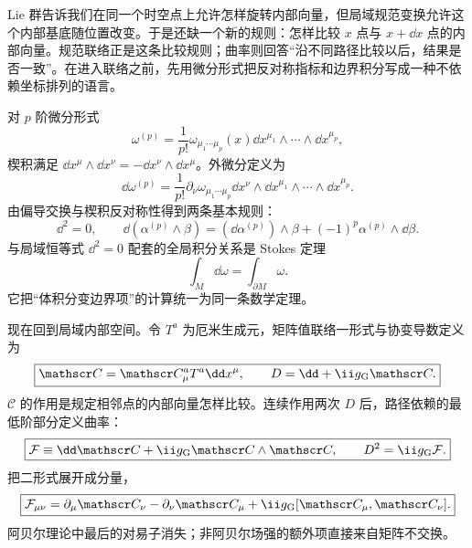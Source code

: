 Lie 群告诉我们在同一个时空点上允许怎样旋转内部向量，但局域规范变换允许这个内部基底随位置改变。于是还缺一个新的规则：怎样比较 $x$ 点与 $x+\dd x$ 点的内部向量。规范联络正是这条比较规则；曲率则回答“沿不同路径比较以后，结果是否一致”。在进入联络之前，先用微分形式把反对称指标和边界积分写成一种不依赖坐标排列的语言。

对 $p$ 阶微分形式
\begin{equation*}
 \omega^{(p)}
 =\frac1{p!}\omega_{\mu_1\cdots\mu_p}(x)
 \dd x^{\mu_1}\wedge\cdots\wedge\dd x^{\mu_p},
\end{equation*}
楔积满足 $\dd x^\mu\wedge\dd x^\nu=-\dd x^\nu\wedge\dd x^\mu$。外微分定义为
\begin{equation}
 \dd\omega^{(p)}
 =\frac1{p!}\partial_\nu\omega_{\mu_1\cdots\mu_p}
 \dd x^\nu\wedge\dd x^{\mu_1}\wedge\cdots\wedge\dd x^{\mu_p}.
 \label{eq:exterior-derivative-definition-dp68}
\end{equation}
由偏导交换与楔积反对称性得到两条基本规则：
\begin{equation}
 \boxed{
 \dd^2=0,
 \qquad
 \dd(\alpha^{(p)}\wedge\beta)
 =(\dd\alpha^{(p)})\wedge\beta
 +(-1)^p\alpha^{(p)}\wedge\dd\beta.}
 \label{eq:exterior-calculus-identities-dp68}
\end{equation}
与局域恒等式 $\dd^2=0$ 配套的全局积分关系是 Stokes 定理
\begin{equation}
 \boxed{\displaystyle \int_M\dd\omega=\int_{\partial M}\omega.}
 \label{eq:stokes-forms-dp11}
\end{equation}
它把“体积分变边界项”的计算统一为同一条数学定理。

现在回到局域内部空间。令 $T^a$ 为厄米生成元，矩阵值联络一形式与协变导数定义为
\begin{equation}
 \boxed{
 \mathscr C=\mathscr C_\mu^aT^a\dd x^\mu,
 \qquad
 D=\dd+\ii g_{\rm G}\mathscr C.}
 \label{eq:connection-oneform-dp11}
\end{equation}
$\mathscr C$ 的作用是规定相邻点的内部向量怎样比较。连续作用两次 $D$ 后，路径依赖的最低阶部分定义曲率：
\begin{equation}
 \boxed{
 \mathcal F\equiv\dd\mathscr C+\ii g_{\rm G}\mathscr C\wedge\mathscr C,
 \qquad
 D^2=\ii g_{\rm G}\mathcal F.}
 \label{eq:curvature-form-dp11}
\end{equation}
把二形式展开成分量，
\begin{equation}
 \boxed{
 \mathcal F_{\mu\nu}
 =\partial_\mu\mathscr C_\nu-\partial_\nu\mathscr C_\mu
 +\ii g_{\rm G}[\mathscr C_\mu,\mathscr C_\nu].}
 \label{eq:curvature-components-dp68}
\end{equation}
阿贝尔理论中最后的对易子消失；非阿贝尔场强的额外项直接来自矩阵不交换。

